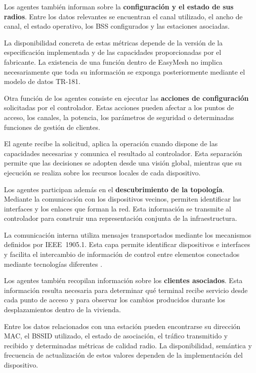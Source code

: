 Los agentes también informan sobre la
\textbf{configuración y el estado de sus radios}. Entre los datos
relevantes se encuentran el canal utilizado, el ancho de canal, el estado
operativo, los BSS configurados y las estaciones asociadas.

La disponibilidad concreta de estas métricas depende de la versión de la
especificación implementada y de las capacidades proporcionadas por el
fabricante. La existencia de una función dentro de EasyMesh no implica
necesariamente que toda su información se exponga posteriormente mediante
el modelo de datos TR-181.

Otra función de los agentes consiste en ejecutar las
\textbf{acciones de configuración} solicitadas por el controlador. Estas
acciones pueden afectar a los puntos de acceso, los canales, la potencia,
los parámetros de seguridad o determinadas funciones de gestión de
clientes.

El agente recibe la solicitud, aplica la operación cuando dispone de las
capacidades necesarias y comunica el resultado al controlador. Esta
separación permite que las decisiones se adopten desde una visión global,
mientras que su ejecución se realiza sobre los recursos locales de cada
dispositivo.

Los agentes participan además en el
\textbf{descubrimiento de la topología}. Mediante la comunicación con los
dispositivos vecinos, permiten identificar las interfaces y los enlaces
que forman la red. Esta información se transmite al controlador para
construir una representación conjunta de la infraestructura.

La comunicación interna utiliza mensajes transportados mediante los
mecanismos definidos por IEEE~1905.1. Esta capa permite identificar
dispositivos e interfaces y facilita el intercambio de información de
control entre elementos conectados mediante tecnologías diferentes
\cite{ieee_1905_1}.

Los agentes también recopilan información sobre los
\textbf{clientes asociados}. Esta información resulta necesaria para
determinar qué terminal recibe servicio desde cada punto de acceso y para
observar los cambios producidos durante los desplazamientos dentro de la
vivienda.

Entre los datos relacionados con una estación pueden encontrarse su
dirección MAC, el BSSID utilizado, el estado de asociación, el tráfico
transmitido y recibido y determinadas métricas de calidad radio. La
disponibilidad, semántica y frecuencia de actualización de estos valores
dependen de la implementación del dispositivo.

